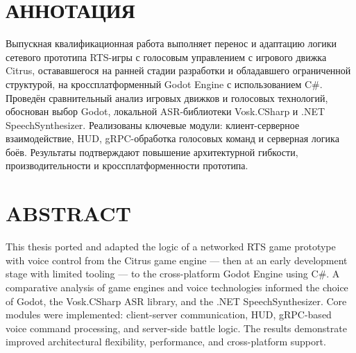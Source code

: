 \section*{АННОТАЦИЯ}

Выпускная квалификационная работа выполняет перенос и адаптацию логики сетевого прототипа RTS-игры с голосовым управлением с игрового движка Citrus, 
остававшегося на ранней стадии разработки и обладавшего ограниченной структурой, на кроссплатформенный Godot Engine с использованием C\#. 
Проведён сравнительный анализ игровых движков и голосовых технологий, обоснован выбор Godot, локальной ASR-библиотеки Vosk.CSharp и 
.NET SpeechSynthesizer. Реализованы ключевые модули: клиент-серверное взаимодействие, HUD, gRPC-обработка голосовых 
команд и серверная логика боёв. Результаты подтверждают повышение архитектурной гибкости, производительности и кроссплатформенности прототипа.
\section*{ABSTRACT}

This thesis ported and adapted the logic of a networked RTS game prototype with voice control from the Citrus game engine — then at an early development 
stage with limited tooling — to the cross-platform Godot Engine using C\#. A comparative analysis of game engines and voice technologies informed the
choice of Godot, the Vosk.CSharp ASR library, and the .NET SpeechSynthesizer. Core modules were implemented: client-server communication, 
HUD, gRPC-based voice command processing, and server-side battle logic. The results demonstrate improved architectural 
flexibility, performance, and cross-platform support.
